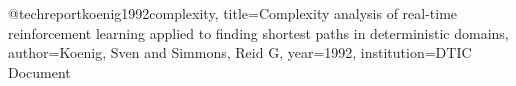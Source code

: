 
@techreport{koenig1992complexity,
  title={Complexity analysis of real-time reinforcement learning applied to finding shortest paths in deterministic domains},
  author={Koenig, Sven and Simmons, Reid G},
  year={1992},
  institution={DTIC Document}
}